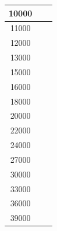 \documentclass{llncs}
\begin{document}
\begin{longtable}{|c|c|c|}
			10000                    &                                                   &                                                      \\ \hline
			11000                    &                                                   &                                                      \\ \hline
			12000                    &                                                   &                                                      \\ \hline
			13000                    &                                                   &                                                      \\ \hline
			15000                    &                                                   &                                                      \\ \hline
			16000                    &                                                   &                                                      \\ \hline
			18000                    &                                                   &                                                      \\ \hline
			20000                    &                                                   &                                                      \\ \hline
			22000                    &                                                   &                                                      \\ \hline
			24000                    &                                                   &                                                      \\ \hline
			27000                    &                                                   &                                                      \\ \hline
			30000                    &                                                   &                                                      \\ \hline
			33000                    &                                                   &                                                      \\ \hline
			36000                    &                                                   &                                                      \\ \hline
			39000                    &                                                   &                                                      \\ \hline

\end{longtable}
\end{document}
